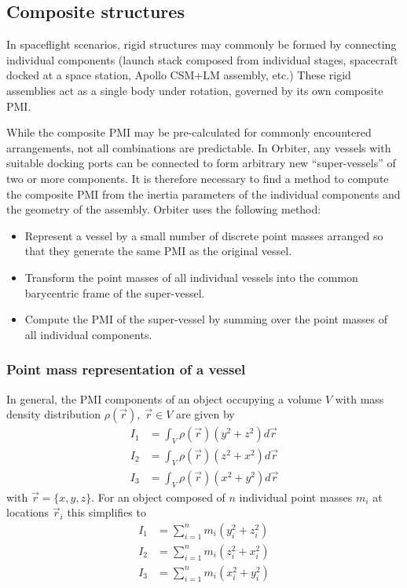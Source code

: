 \documentclass[Orbiter Technical Reference.tex]{subfiles}
\begin{document}
\subsection{Composite structures}
In spaceflight scenarios, rigid structures may commonly be formed by connecting individual components (launch stack composed from individual stages, spacecraft docked at a space station, Apollo CSM+LM assembly, etc.) These rigid assemblies act as a single body under rotation, governed by its own composite PMI.

While the composite PMI may be pre-calculated for commonly encountered arrangements, not all combinations are predictable. In Orbiter, any vessels with suitable docking ports can be connected to form arbitrary new ``super-vessels'' of two or more components. It is therefore necessary to find a method to compute the composite PMI from the inertia parameters of the individual components and the geometry of the assembly.
Orbiter uses the following method:
\begin{itemize}
\item Represent a vessel by a small number of discrete point masses arranged so that they generate the same PMI as the original vessel.
\item Transform the point masses of all individual vessels into the common barycentric frame of the super-vessel.
\item Compute the PMI of the super-vessel by summing over the point masses of all individual components.
\end{itemize}

\subsubsection{Point mass representation of a vessel}
In general, the PMI components of an object occupying a volume $V$ with mass density distribution $\rho(\vec{r}),\; \vec{r}\in V$ are given by
\begin{equation}
\begin{split}
  I_1 &= \int_V \rho(\vec{r}) (y^2 + z^2) d\vec{r} \\
  I_2 &= \int_V \rho(\vec{r}) (z^2 + x^2) d\vec{r} \\
  I_3 &= \int_V \rho(\vec{r}) (x^2 + y^2) d\vec{r}
\end{split}
\end{equation}
with $\vec{r} = \lbrace x,y,z \rbrace$.
For an object composed of $n$ individual point masses $m_i$ at locations $\vec{r}_i$ this simplifies to
\begin{equation}
\begin{split}
  I_1 &= \sum_{i=1}^n m_i (y_i^2 + z_i^2) \\
  I_2 &= \sum_{i=1}^n m_i (z_i^2 + x_i^2) \\
  I_3 &= \sum_{i=1}^n m_i (x_i^2 + y_i^2)
\end{split}
\end{equation}
\end{document}
